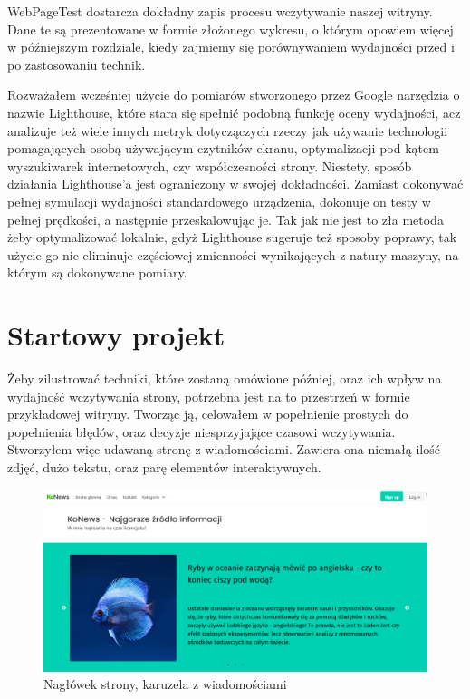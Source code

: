 \documentclass[licencjacka]{pracadypl}
\begin{document}
WebPageTest dostarcza dokładny zapis procesu wczytywanie naszej witryny. Dane te są prezentowane w formie złożonego wykresu, o którym opowiem więcej w późniejszym rozdziale, kiedy zajmiemy się porównywaniem wydajności przed i po zastosowaniu technik.

Rozważałem wcześniej użycie do pomiarów stworzonego przez Google narzędzia o nazwie Lighthouse, które stara się spełnić podobną funkcję oceny wydajności, acz analizuje też wiele innych metryk dotyczączych rzeczy jak używanie technologii pomagających osobą używającym czytników ekranu, optymalizacji pod kątem wyszukiwarek internetowych, czy współczesności strony. Niestety, sposób działania Lighthouse'a jest ograniczony w swojej dokładności. Zamiast dokonywać pełnej symulacji wydajności standardowego urządzenia, dokonuje on testy w pełnej prędkości, a następnie przeskalowując je. Tak jak nie jest to zła metoda żeby optymalizować lokalnie, gdyż Lighthouse sugeruje też sposoby poprawy, tak użycie go nie eliminuje częściowej zmienności wynikających z natury maszyny, na którym są dokonywane pomiary.

\chapter{Startowy projekt}
Żeby zilustrować techniki, które zostaną omówione później, oraz ich wpływ na wydajność wczytywania strony, potrzebna jest na to przestrzeń w formie przykładowej witryny. Tworząc ją, celowałem w popełnienie prostych do popełnienia błędów, oraz decyzje niesprzyjające czasowi wczytywania. Stworzyłem więc udawaną stronę z wiadomościami. Zawiera ona niemałą ilość zdjęć, dużo tekstu, oraz parę elementów interaktywnych. 

\begin{figure}[H]
  \includegraphics[width=\linewidth]{images/frontpage.png}
  \caption{Nagłówek strony, karuzela z wiadomościami}
  \label{fig:frontpage}
\end{figure}
\end{document}
